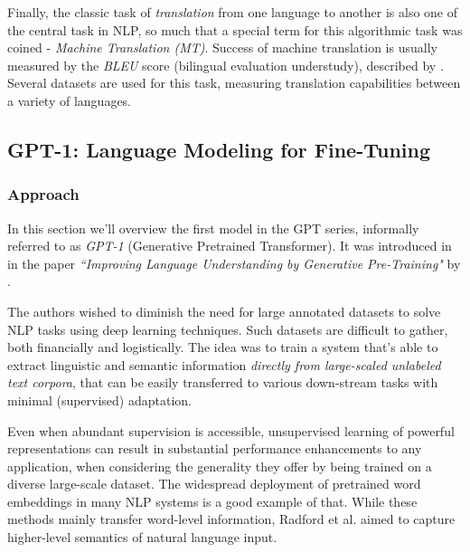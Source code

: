 \documentclass{article}
\begin{document}
\medskip
\noindent
Finally, the classic task of \emph{translation} from one language to another is also one of the central task in NLP, so much that a special term for this algorithmic task was coined - \emph{Machine Translation (MT)}. Success of machine translation is usually measured by the \emph{BLEU} score (bilingual evaluation understudy), described by \citet{papineni2002bleu}. Several datasets are used for this task, measuring translation capabilities between a variety of languages.



\subsection{GPT-1: Language Modeling for Fine-Tuning}
\label{sec:gpt1}

\subsubsection{Approach}
\label{subsec:gpt1-approach}

In this section we'll overview the first model in the GPT series, informally referred to as \emph{GPT-1} (Generative Pretrained Transformer). It was introduced in \citeyear{radford2018gpt1} in the paper \emph{``Improving Language Understanding by Generative Pre-Training"} by \citet{radford2018gpt1}.

\medskip
\noindent
The authors wished to diminish the need for large annotated datasets to solve NLP tasks using deep learning techniques. Such datasets are difficult to gather, both financially and logistically. The idea was to train a system that's able to extract linguistic and semantic information \emph{directly from large-scaled unlabeled text corpora}, that can be easily transferred to various down-stream tasks with minimal (supervised) adaptation.

\medskip
\noindent
Even when abundant supervision is accessible, unsupervised learning of powerful representations can result in substantial performance enhancements to any application, when considering the generality they offer by being trained on a diverse large-scale dataset. The widespread deployment of pretrained word embeddings in many NLP systems is a good example of that. While these methods mainly transfer word-level information, Radford et al. aimed to capture higher-level semantics of natural language input.
\end{document}

